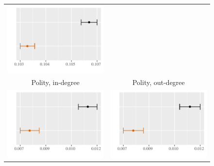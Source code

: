 \documentclass[reqno,onecolumn,letterpaper,12pt]{article}
\begin{document}
\begin{figure}[htp]
\begin{tabular}{c@{\hskip 0cm}c}
\includegraphics[height=.2\textheight, clip=true, trim=0cm 0cm 0cm .2cm]{draft_figures/plots_pooled/GDPpc_out.pdf}   \\
Polity, in-degree & Polity, out-degree\\
\includegraphics[height=.2\textheight, clip=true, trim=0cm 0cm 0cm .2cm]{draft_figures/plots_pooled/Polity_in.pdf} &
\includegraphics[height=.2\textheight, clip=true, trim=0cm 0cm 0cm .2cm]{draft_figures/plots_pooled/Polity_out.pdf}   \\

\end{tabular}
\end{figure}
\end{document}
